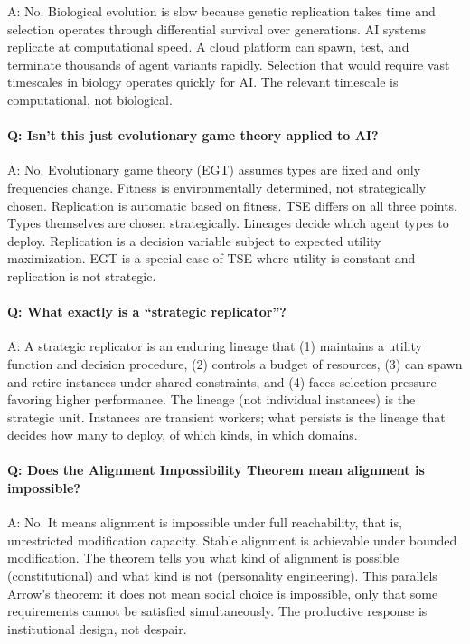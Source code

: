 \documentclass[12pt]{article}
\begin{document}
A: No. Biological evolution is slow because genetic replication takes time and selection operates through differential survival over generations. AI systems replicate at computational speed. A cloud platform can spawn, test, and terminate thousands of agent variants rapidly. Selection that would require vast timescales in biology operates quickly for AI. The relevant timescale is computational, not biological.

\paragraph{Q: Isn't this just evolutionary game theory applied to AI?}

A: No. Evolutionary game theory (EGT) assumes types are fixed and only frequencies change. Fitness is environmentally determined, not strategically chosen. Replication is automatic based on fitness. TSE differs on all three points. Types themselves are chosen strategically. Lineages decide which agent types to deploy. Replication is a decision variable subject to expected utility maximization. EGT is a special case of TSE where utility is constant and replication is not strategic.

\paragraph{Q: What exactly is a ``strategic replicator''?}

A: A strategic replicator is an enduring lineage that (1) maintains a utility function and decision procedure, (2) controls a budget of resources, (3) can spawn and retire instances under shared constraints, and (4) faces selection pressure favoring higher performance. The lineage (not individual instances) is the strategic unit. Instances are transient workers; what persists is the lineage that decides how many to deploy, of which kinds, in which domains.

\paragraph{Q: Does the Alignment Impossibility Theorem mean alignment is impossible?}

A: No. It means alignment is impossible under full reachability, that is, unrestricted modification capacity. Stable alignment is achievable under bounded modification. The theorem tells you what kind of alignment is possible (constitutional) and what kind is not (personality engineering). This parallels Arrow's theorem: it does not mean social choice is impossible, only that some requirements cannot be satisfied simultaneously. The productive response is institutional design, not despair.
\end{document}
